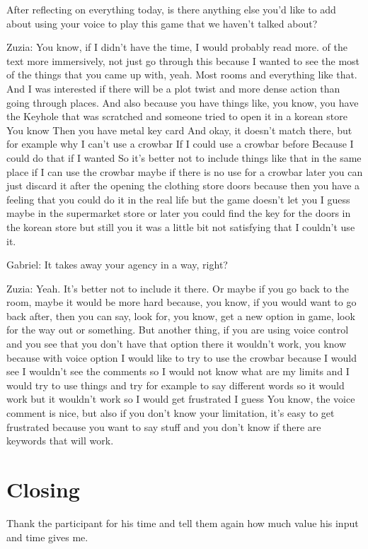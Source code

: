 \begin{QandA}
   \item After reflecting on everything today, is there anything else you’d like to add about using your voice to play this game that we haven't talked about?

         \begin{answered}
            Zuzia: You know, if I didn't have the time, I would probably read more.
            of the text more immersively, not just go through this because I wanted to see the most of the things that you came up with, yeah.
            Most rooms and everything like that.
            And I was interested if there will be a plot twist and more dense action than going through places.
            And also because you have things like, you know, you have the
            Keyhole that was scratched and someone tried to open it in a korean store You know Then you have metal key card And okay, it doesn't match there, but for example why I can't use a crowbar If I could use a crowbar before Because I could do that if I wanted So it's better not to include things like that
            in the same place if I can use the crowbar maybe if there is no use for a crowbar later you can just discard it after the opening the clothing store doors because then you have a feeling that you could do it in the real life but the game doesn't let you I guess maybe in the supermarket store or later you could find the key for the doors in the korean store but still you
            it was a little bit not satisfying that I couldn't use it.


            Gabriel: It takes away your agency in a way, right?


            Zuzia: Yeah.
            It's better not to include it there.
            Or maybe if you go back to the room, maybe it would be more hard because, you know, if you would want to go back after, then you can say, look for, you know, get a new option in game, look for the way out or something.
            But another thing, if you are
            using voice control and you see that you don't have that option there it wouldn't work, you know because with voice option I would like to try to use the crowbar because I would see I wouldn't see the comments so I would not know what are my limits and I would try to use things and try for example to say different words so it would work but it wouldn't work so I would get frustrated I guess
            You know, the voice comment is nice, but also if you don't know your limitation, it's easy to get frustrated because you want to say stuff and you don't know if there are keywords that will work.
          
         \end{answered}
\end{QandA}

\section{Closing}
Thank the participant for his time and tell them again how much value his input and time gives me.






